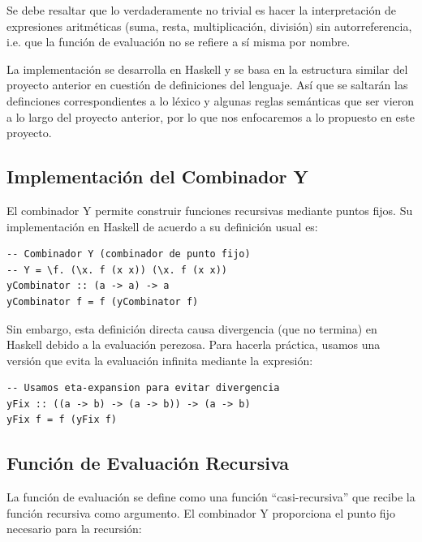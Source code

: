\documentclass[11pt]{article}
\begin{document}
Se debe resaltar que lo verdaderamente no trivial es hacer la interpretación de expresiones aritméticas (suma, resta, multiplicación, división) sin autorreferencia, i.e. que la función de evaluación no se refiere a sí misma por nombre.

La implementación se desarrolla en Haskell y se basa en la estructura similar del proyecto anterior en cuesti\'on de definiciones del lenguaje. As\'i que se saltar\'an las definciones correspondientes a lo l\'exico y algunas reglas sem\'anticas que ser vieron a lo largo del proyecto anterior, por lo que nos enfocaremos a lo propuesto en este proyecto.






\subsection{Implementación del Combinador Y}

El combinador Y permite construir funciones recursivas mediante puntos fijos. Su implementación en Haskell de acuerdo a su definici\'on usual es:

\begin{lstlisting}[caption={Implementación del combinador Y}]
-- Combinador Y (combinador de punto fijo)
-- Y = \f. (\x. f (x x)) (\x. f (x x))
yCombinator :: (a -> a) -> a
yCombinator f = f (yCombinator f)
\end{lstlisting}

Sin embargo, esta definición directa causa divergencia (que no termina) en Haskell debido a la evaluación perezosa. Para hacerla práctica, usamos una versión que evita la evaluación infinita mediante la expresi\'on:

\begin{lstlisting}[caption={Implementación práctica del combinador Y en Haskell}]
-- Usamos eta-expansion para evitar divergencia
yFix :: ((a -> b) -> (a -> b)) -> (a -> b)
yFix f = f (yFix f)
\end{lstlisting}

\subsection{Función de Evaluación Recursiva}

La función de evaluación se define como una función ``casi-recursiva'' que recibe la función recursiva como argumento. El combinador Y proporciona el punto fijo necesario para la recursión:
\end{document}
